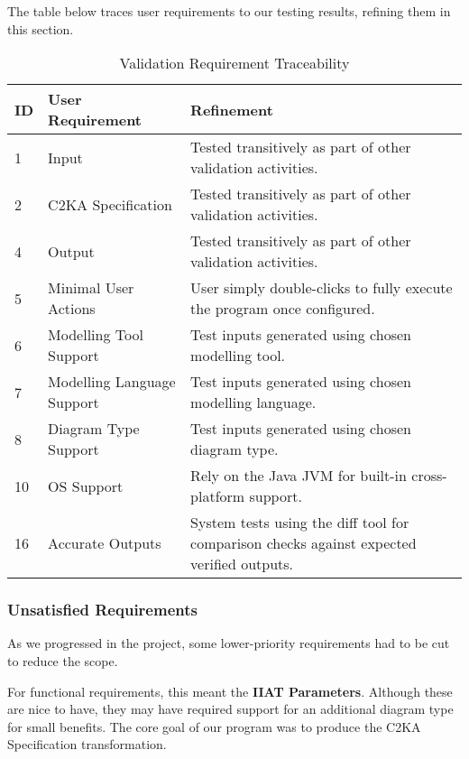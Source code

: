 The table below traces user requirements to our testing results, refining them in this section.
\begin{table}[htbp]
    \centering
    \caption{Validation Requirement Traceability}\label{tab:test-res-table}
    \begin{tabularx}{\textwidth}{| l | l | X |}
        \hline
        \textbf{ID} & \textbf{User Requirement} & \textbf{Refinement} \\
        \hline
        1 & Input & Tested transitively as part of other validation activities. \\ \hline
        2 & C2KA Specification & Tested transitively as part of other validation activities.\\ \hline
        4 & Output & Tested transitively as part of other validation activities.\\ \hline
        5 & Minimal User Actions & User simply double-clicks to fully execute the program once configured.\\ \hline
        6 & Modelling Tool Support & Test inputs generated using chosen modelling tool.\\ \hline
        7 & Modelling Language Support  & Test inputs generated using chosen modelling language.\\ \hline
        8 & Diagram Type Support  & Test inputs generated using chosen diagram type.\\ \hline
        10 & OS Support & Rely on the Java JVM for built-in cross-platform support.\\ \hline
        16 & Accurate Outputs & System tests using the diff tool for comparison checks against expected verified outputs. \\ \hline
    \end{tabularx}
\end{table}

\newpage
\subsubsection{Unsatisfied Requirements} \label{subsubsec:unsat-reqs}
As we progressed in the project, some lower-priority requirements had to be cut to reduce the scope.

For functional requirements, this meant the \textbf{IIAT Parameters}.
Although these are nice to have, they may have required support for an additional diagram type for small benefits.
The core goal of our program was to produce the C2KA Specification transformation.

